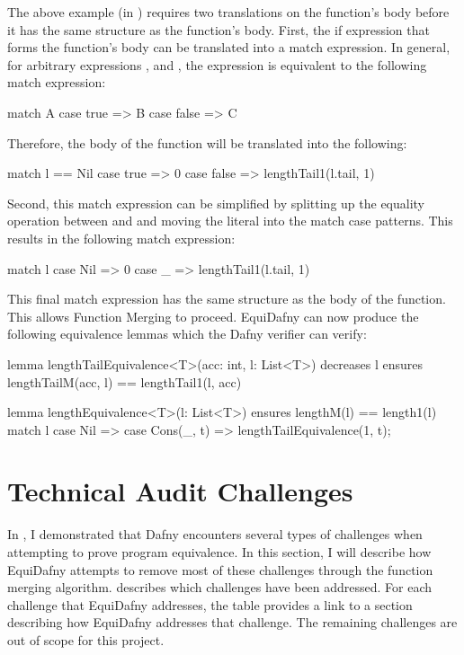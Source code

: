 The above example (in ) requires two translations on the  function's body before it has the same structure as the  function's body. First, the if expression that forms the  function's body can be translated into a match expression. In general, for arbitrary expressions ,  and , the expression  is equivalent to the following match expression:
\begin{dafny}
match A {
    case true => B
    case false => C
}
\end{dafny}
%
Therefore, the body of the  function will be translated into the following:
\begin{dafny}
match l == Nil {
    case true => 0
    case false => lengthTail1(l.tail, 1)
}
\end{dafny}
%
Second, this match expression can be simplified by splitting up the equality operation between  and  and moving the  literal into the match case patterns. This results in the following match expression:
\begin{dafny}
match l {
    case Nil => 0
    case _ => lengthTail1(l.tail, 1)
}
\end{dafny}
%
This final match expression has the same structure as the body of the  function. This allows Function Merging to proceed. EquiDafny can now produce the following equivalence lemmas which the Dafny verifier can verify:
\begin{dafny}
lemma lengthTailEquivalence<T>(acc: int, l: List<T>)
    decreases l
    ensures lengthTailM(acc, l) == lengthTail1(l, acc)
{}

lemma lengthEquivalence<T>(l: List<T>)
    ensures lengthM(l) == length1(l)
{
    match l {
        case Nil => 
        case Cons(_, t) => lengthTailEquivalence(1, t);
    }
}
\end{dafny}
%

\section{Technical Audit Challenges}\label{sec:addressing-challenges}

In , I demonstrated that Dafny encounters several types of challenges when attempting to prove program equivalence. In this section, I will describe how EquiDafny attempts to remove most of these challenges through the function merging algorithm.  describes which challenges have been addressed. For each challenge that EquiDafny addresses, the table provides a link to a section describing how EquiDafny addresses that challenge. The remaining challenges are out of scope for this project.

